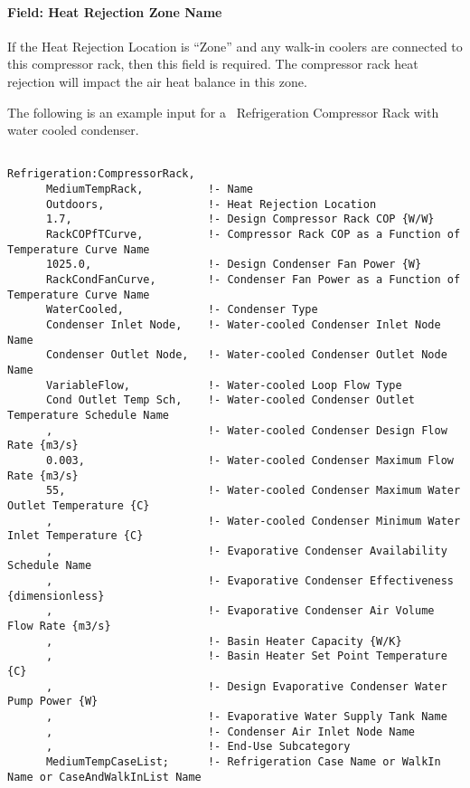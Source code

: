 \paragraph{Field: Heat Rejection Zone Name}\label{field-heat-rejection-zone-name}

If the Heat Rejection Location is ``Zone'' and any walk-in coolers are connected to this compressor rack, then this field is required. The compressor rack heat rejection will impact the air heat balance in this zone.

The following is an example input for a~ Refrigeration Compressor Rack with water cooled condenser.

\begin{lstlisting}

Refrigeration:CompressorRack,
      MediumTempRack,          !- Name
      Outdoors,                !- Heat Rejection Location
      1.7,                     !- Design Compressor Rack COP {W/W}
      RackCOPfTCurve,          !- Compressor Rack COP as a Function of Temperature Curve Name
      1025.0,                  !- Design Condenser Fan Power {W}
      RackCondFanCurve,        !- Condenser Fan Power as a Function of Temperature Curve Name
      WaterCooled,             !- Condenser Type
      Condenser Inlet Node,    !- Water-cooled Condenser Inlet Node Name
      Condenser Outlet Node,   !- Water-cooled Condenser Outlet Node Name
      VariableFlow,            !- Water-cooled Loop Flow Type
      Cond Outlet Temp Sch,    !- Water-cooled Condenser Outlet Temperature Schedule Name
      ,                        !- Water-cooled Condenser Design Flow Rate {m3/s}
      0.003,                   !- Water-cooled Condenser Maximum Flow Rate {m3/s}
      55,                      !- Water-cooled Condenser Maximum Water Outlet Temperature {C}
      ,                        !- Water-cooled Condenser Minimum Water Inlet Temperature {C}
      ,                        !- Evaporative Condenser Availability Schedule Name
      ,                        !- Evaporative Condenser Effectiveness {dimensionless}
      ,                        !- Evaporative Condenser Air Volume Flow Rate {m3/s}
      ,                        !- Basin Heater Capacity {W/K}
      ,                        !- Basin Heater Set Point Temperature {C}
      ,                        !- Design Evaporative Condenser Water Pump Power {W}
      ,                        !- Evaporative Water Supply Tank Name
      ,                        !- Condenser Air Inlet Node Name
      ,                        !- End-Use Subcategory
      MediumTempCaseList;      !- Refrigeration Case Name or WalkIn Name or CaseAndWalkInList Name
\end{lstlisting}

